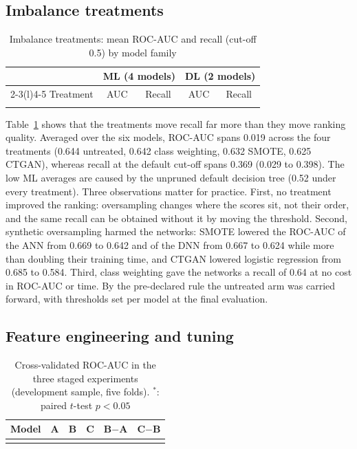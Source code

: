 \documentclass[conference]{IEEEtran}
\begin{document}
\subsection{Imbalance treatments}
\begin{table}[t]
\caption{Imbalance treatments: mean ROC-AUC and recall (cut-off 0.5) by model family}
\label{tab:imb}
\centering
\footnotesize
\begin{tabular}{@{}lcccc@{}}
\toprule
 & \multicolumn{2}{c}{ML (4 models)} & \multicolumn{2}{c}{DL (2 models)} \\
\cmidrule(lr){2-3}\cmidrule(l){4-5}
Treatment & AUC & Recall & AUC & Recall \\
\midrule
\\
\bottomrule
\end{tabular}
\end{table}

Table~\ref{tab:imb} shows that the treatments move recall far more than they move ranking quality. Averaged over the six models, ROC-AUC spans 0.019 across the four treatments (0.644 untreated, 0.642 class weighting, 0.632 SMOTE, 0.625 CTGAN), whereas recall at the default cut-off spans 0.369 (0.029 to 0.398). The low ML averages are caused by the unpruned default decision tree (0.52 under every treatment). Three observations matter for practice. First, no treatment improved the ranking: oversampling changes where the scores sit, not their order, and the same recall can be obtained without it by moving the threshold. Second, synthetic oversampling harmed the networks: SMOTE lowered the ROC-AUC of the ANN from 0.669 to 0.642 and of the DNN from 0.667 to 0.624 while more than doubling their training time, and CTGAN lowered logistic regression from 0.685 to 0.584. Third, class weighting gave the networks a recall of 0.64 at no cost in ROC-AUC or time. By the pre-declared rule the untreated arm was carried forward, with thresholds set per model at the final evaluation.

\subsection{Feature engineering and tuning}
\begin{table}[t]
\caption{Cross-validated ROC-AUC in the three staged experiments (development sample, five folds). $^{*}$: paired $t$-test $p<0.05$}
\label{tab:stages}
\centering
\footnotesize
\begin{tabular}{@{}lccccc@{}}
\toprule
Model & A & B & C & B$-$A & C$-$B \\
\midrule
\\
\bottomrule
\end{tabular}
\end{table}
\end{document}
